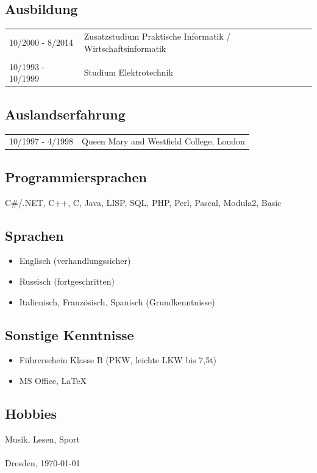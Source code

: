 \documentclass{article}
\begin{document}
\subsection*{Ausbildung}

\begin{tabular}{lp{15cm}}
10/2000 - 8/2014	& Zusatzstudium Praktische Informatik / Wirtschaftsinformatik\\
\\
10/1993 - 10/1999	& Studium Elektrotechnik\\
\end{tabular}


\subsection*{Auslandserfahrung}
  \begin{tabular}{lp{15cm}}
    10/1997 - 4/1998	& Queen Mary and Westfield College, London
  \end{tabular}
	
\subsection*{Programmiersprachen}
  C\#/.NET, C++, C, Java, LISP, SQL, PHP, Perl, Pascal, Modula2, Basic
		
\subsection*{Sprachen}
  \begin{itemize}
    \item{Englisch (verhandlungssicher)}
    \item{Russisch (fortgeschritten)}
    \item{Italienisch, Französisch, Spanisch (Grundkenntnisse)}
  \end{itemize}

\subsection*{Sonstige Kenntnisse}
  \begin{itemize}
    \item{F\"uhrerschein Klasse B (PKW, leichte LKW bis 7,5t)}
    \item{MS Office, \LaTeX{}}
  \end{itemize}

\subsection*{Hobbies}
Musik, Lesen, Sport\\
\\
Dresden, %
\today
\end{document}
